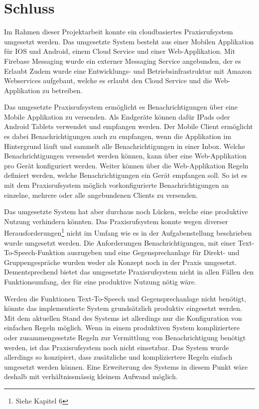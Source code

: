 \section {Schluss}

Im Rahmen dieser Projektarbeit konnte ein cloudbasiertes Praxisrufsystem umgesetzt werden.
Das umgesetzte System besteht aus einer Mobilen Applikation für IOS und Android, einem Cloud Service und einer Web-Applikation.
Mit Firebase Messaging wurde ein externer Messaging Service angebunden, der es Erlaubt
Zudem wurde eine Entwicklungs- und Betriebsinfrastruktur mit Amazon Webservices aufgebaut, welche es erlaubt den Cloud Service und die Web-Applikation zu betreiben.

Das umgesetzte Praxisrufsystem ermöglicht es Benachrichtigungen über eine Mobile Applikation zu versenden.
Als Endgeräte können dafür IPads oder Android Tablets verwendet und empfangen werden.
Der Mobile Client ermöglicht es dabei Benachrichtigungen auch zu empfangen, wenn die Applikation im Hintergrund läuft und sammelt alle Benachrichtigungen in einer Inbox.
Welche Benachrichtigungen versendet werden können, kann über eine Web-Applikation pro Gerät konfiguriert werden.
Weiter können über die Web-Applikation Regeln definiert werden, welche Benachrichtigungen ein Gerät empfangen soll.
So ist es mit dem Praxisrufsystem möglich vorkonfigurierte Benachrichtigungen an einzelne, mehrere oder alle angebundenen Clients zu versenden.

Das umgesetzte System hat aber durchaus noch Lücken, welche eine produktive Nutzung verhindern könnten.
Das Praxisrufsystem konnte wegen diverser Herausforderungen\footnote{Siehe Kapitel 6} nicht im Umfang wie es in der Aufgabenstellung beschrieben wurde umgesetzt werden.
Die Anforderungen Benachrichtigungen, mit einer Text-To-Speech-Funktion auszugeben und eine Gegensprechanlage für Direkt- und Gruppengespräche wurden weder als Konzept noch in der Praxis umgesetzt.
Dementsprechend bietet das umgesetzte Praxisrufsystem nicht in allen Fällen den Funktionsumfang, der für eine produktive Nutzung nötig wäre.

Werden die Funktionen Text-To-Speech und Gegensprechanlage nicht benötigt, könnte das implementierte System grundsätzlich produktiv eingesetzt werden.
Mit dem aktuellen Stand des Systems ist allerdings nur die Konfiguration von einfachen Regeln möglich.
Wenn in einem produktiven System kompliziertere oder zusammengesetzte Regeln zur Vermittlung von Benachrichtigung benötigt werden, ist das Praxisrufsystem noch nicht einsetzbar.
Das System wurde allerdings so konzipiert, dass zusätzliche und kompliziertere Regeln einfach umgesetzt werden können.
Eine Erweiterung des Systems in diesem Punkt wäre deshalb mit verhältnissmässig kleinem Aufwand möglich.

